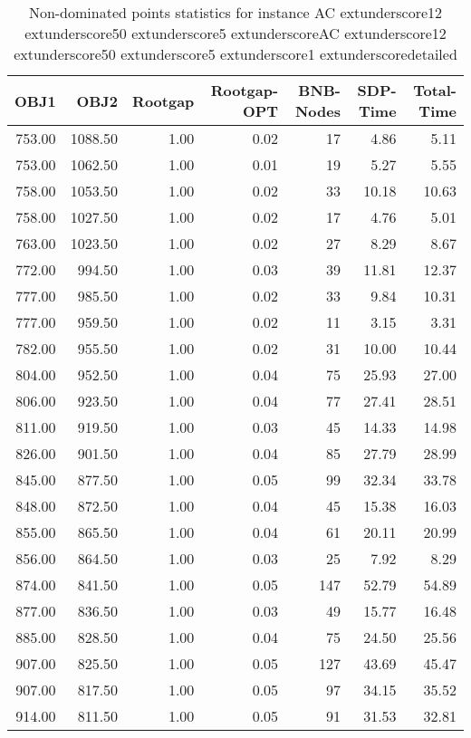\begin{table}
\caption{Non-dominated points statistics for instance AC	extunderscore12	extunderscore50	extunderscore5	extunderscoreAC	extunderscore12	extunderscore50	extunderscore5	extunderscore1	extunderscoredetailed}
\label{tab:stats/AC_12_50_5_AC_12_50_5_1_detailed}
\begin{tabular}{rrrrrrr}
\toprule
OBJ1 & OBJ2 & Rootgap & Rootgap-OPT & BNB-Nodes & SDP-Time & Total-Time \\
\midrule
753.00 & 1088.50 & 1.00 & 0.02 & 17 & 4.86 & 5.11 \\
753.00 & 1062.50 & 1.00 & 0.01 & 19 & 5.27 & 5.55 \\
758.00 & 1053.50 & 1.00 & 0.02 & 33 & 10.18 & 10.63 \\
758.00 & 1027.50 & 1.00 & 0.02 & 17 & 4.76 & 5.01 \\
763.00 & 1023.50 & 1.00 & 0.02 & 27 & 8.29 & 8.67 \\
772.00 & 994.50 & 1.00 & 0.03 & 39 & 11.81 & 12.37 \\
777.00 & 985.50 & 1.00 & 0.02 & 33 & 9.84 & 10.31 \\
777.00 & 959.50 & 1.00 & 0.02 & 11 & 3.15 & 3.31 \\
782.00 & 955.50 & 1.00 & 0.02 & 31 & 10.00 & 10.44 \\
804.00 & 952.50 & 1.00 & 0.04 & 75 & 25.93 & 27.00 \\
806.00 & 923.50 & 1.00 & 0.04 & 77 & 27.41 & 28.51 \\
811.00 & 919.50 & 1.00 & 0.03 & 45 & 14.33 & 14.98 \\
826.00 & 901.50 & 1.00 & 0.04 & 85 & 27.79 & 28.99 \\
845.00 & 877.50 & 1.00 & 0.05 & 99 & 32.34 & 33.78 \\
848.00 & 872.50 & 1.00 & 0.04 & 45 & 15.38 & 16.03 \\
855.00 & 865.50 & 1.00 & 0.04 & 61 & 20.11 & 20.99 \\
856.00 & 864.50 & 1.00 & 0.03 & 25 & 7.92 & 8.29 \\
874.00 & 841.50 & 1.00 & 0.05 & 147 & 52.79 & 54.89 \\
877.00 & 836.50 & 1.00 & 0.03 & 49 & 15.77 & 16.48 \\
885.00 & 828.50 & 1.00 & 0.04 & 75 & 24.50 & 25.56 \\
907.00 & 825.50 & 1.00 & 0.05 & 127 & 43.69 & 45.47 \\
907.00 & 817.50 & 1.00 & 0.05 & 97 & 34.15 & 35.52 \\
914.00 & 811.50 & 1.00 & 0.05 & 91 & 31.53 & 32.81 \\

\end{tabular}
\end{table}
